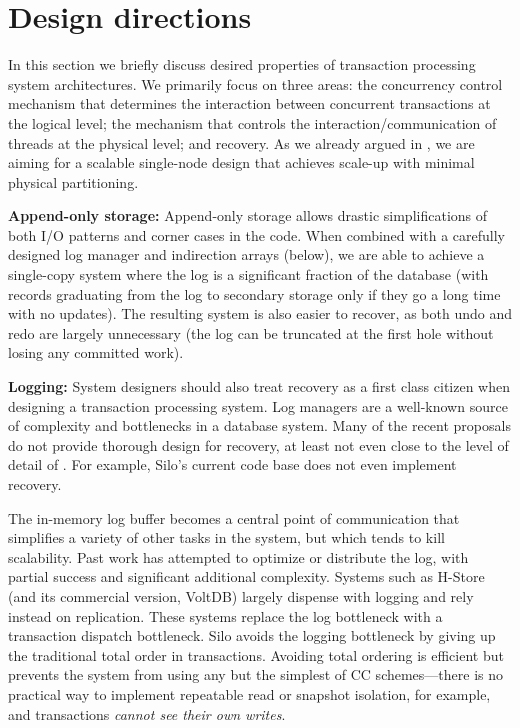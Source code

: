 \section{Design directions}

In this section we briefly discuss desired properties of transaction processing system architectures. We primarily focus on three areas: the concurrency control mechanism that determines the interaction between concurrent transactions at the logical level; the mechanism that controls the interaction/communication of threads at the physical level; and recovery. As we already argued in , we are aiming for a scalable single-node design that achieves scale-up with minimal physical partitioning.  

\vspace{2mm} 
{\bf Append-only storage:}
Append-only storage allows drastic simplifications of both I/O patterns and corner cases in the code. When combined with a carefully designed log manager and indirection arrays (below), we are able to achieve a single-copy system where the log is a significant fraction of the database (with records graduating from the log to secondary storage only if they go a long time with no updates). The resulting system is also easier to recover, as both undo and redo are largely unnecessary (the log can be truncated at the first hole without losing any committed work).

\vspace{2mm} 
{\bf Logging:}
System designers should also treat recovery as a first class citizen when designing a transaction processing system. Log managers are a well-known source of complexity and bottlenecks in a database system. Many of the recent proposals do not provide thorough design for recovery, at least not even close to the level of detail of \cite{MohanHLPS92}. For example, Silo's current code base does not even implement recovery.

The in-memory log buffer becomes a central point of communication that simplifies a variety of other tasks in the system, but which tends to kill scalability. Past work has attempted to optimize \cite{JohnsonPSAA10} or distribute \cite{WangJ14} the log, with partial success and significant additional complexity. Systems such as H-Store \cite{Kallman+08} (and its commercial version, VoltDB) largely dispense with logging and rely instead on replication. These systems replace the log bottleneck with a transaction dispatch bottleneck. Silo avoids the logging bottleneck by giving up the traditional total order in transactions. Avoiding total ordering is efficient but prevents the system from using any but the simplest of CC schemes---there is no practical way to implement repeatable read or snapshot isolation, for example, and transactions {\it cannot see their own writes}.

